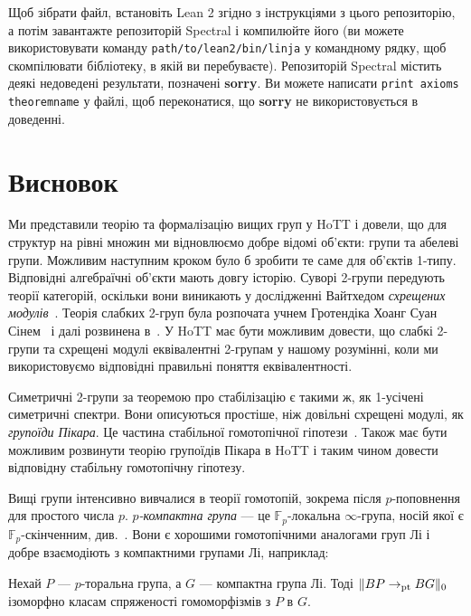 \documentclass[12pt]{article}
\newcommand*{\bF}{{\mathbb{F}}}
\newcommand*{\pt}{{\mathrm{pt}}}
\DeclarePairedDelimiter\trunc{\lVert}{\rVert}
\begin{document}
Щоб зібрати файл, встановіть Lean 2 згідно з інструкціями з цього репозиторію, а потім завантажте репозиторій Spectral і компилюйте його (ви можете використовувати команду \texttt{path/to/lean2/bin/linja} у командному рядку, щоб скомпілювати бібліотеку, в якій ви перебуваєте). Репозиторій Spectral містить деякі недоведені результати, позначені \textbf{sorry}. Ви можете написати \texttt{print axioms theoremname} у файлі, щоб переконатися, що \textbf{sorry} не використовується в доведенні.

\section{Висновок}
\label{sec:conclusion}

Ми представили теорію та формалізацію вищих груп у HoTT і довели, що для структур на рівні множин ми відновлюємо добре відомі об'єкти: групи та абелеві групи. Можливим наступним кроком було б зробити те саме для об'єктів 1-типу. Відповідні алгебраїчні об'єкти мають довгу історію. Суворі 2-групи передують теорії категорій, оскільки вони виникають у дослідженні Вайтхедом \emph{схрещених модулів}~\cite{Whitehead1949}. Теорія слабких 2-груп була розпочата учнем Гротендіка Хоанг Суан Сінем~\cite{Sinh1975} і далі розвинена в~\cite{BaezLauda2004}. У HoTT має бути можливим довести, що слабкі 2-групи та схрещені модулі еквівалентні 2-групам у нашому розумінні, коли ми використовуємо відповідні правильні поняття еквівалентності.

Симетричні 2-групи за теоремою про стабілізацію є такими ж, як 1-усічені симетричні спектри. Вони описуються простіше, ніж довільні схрещені модулі, як \emph{групоїди Пікара}. Це частина стабільної гомотопічної гіпотези~\cite{Gurski-stable-homotopy-hypothesis,JohnsonOsorno}. Також має бути можливим розвинути теорію групоїдів Пікара в HoTT і таким чином довести відповідну стабільну гомотопічну гіпотезу.

Вищі групи інтенсивно вивчалися в теорії гомотопій, зокрема після $p$-поповнення для простого числа $p$. \emph{$p$-компактна група} — це $\bF_p$-локальна $\infty$-група, носій якої є $\bF_p$-скінченним, див.~\cite{DwyerWilkerson1994}. Вони є хорошими гомотопічними аналогами груп Лі і добре взаємодіють з компактними групами Лі, наприклад:

\begin{theorem}
  Нехай $P$ — $p$-торальна група, а $G$ — компактна група Лі. Тоді $\trunc{BP \to_\pt BG}_0$ ізоморфно класам спряженості гомоморфізмів з $P$ в $G$.
\end{theorem}
\end{document}
